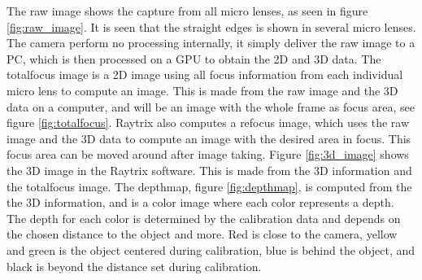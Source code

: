 The raw image shows the capture from all micro lenses, as seen in figure \ref{fig:raw_image}. It is seen that the straight edges is shown in several micro lenses. The camera perform no processing internally, it simply deliver the raw image to a PC, which is then processed on a GPU to obtain the 2D and 3D data. 
The totalfocus image is a 2D image using all focus information from each individual micro lens to compute an image. This is made from the raw image and the 3D data on a computer, and will be an image with the whole frame as focus area, see figure \ref{fig:totalfocus}. 
Raytrix also computes a refocus image, which uses the raw image and the 3D data to compute an image with the desired area in focus. This focus area can be moved around after image taking.
Figure \ref{fig:3d_image} shows the 3D image in the Raytrix software. This is made from the 3D information and the totalfocus image. 
The depthmap, figure \ref{fig:depthmap}, is computed from the the 3D information, and is a color image where each color represents a depth. The depth for each color is determined by the calibration data and depends on the chosen distance to the object and more. 
Red is close to the camera, yellow and green is the object centered during calibration, blue is behind the object, and black is beyond the distance set during calibration.


